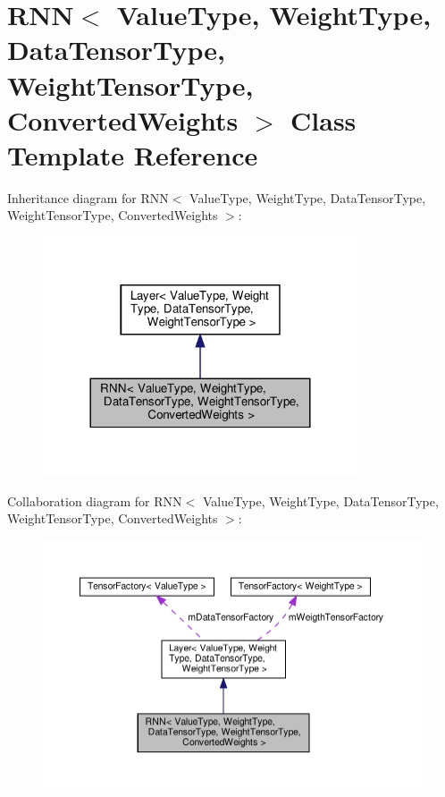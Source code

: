 \hypertarget{classRNN}{}\section{R\+NN$<$ Value\+Type, Weight\+Type, Data\+Tensor\+Type, Weight\+Tensor\+Type, Converted\+Weights $>$ Class Template Reference}
\label{classRNN}


Inheritance diagram for R\+NN$<$ Value\+Type, Weight\+Type, Data\+Tensor\+Type, Weight\+Tensor\+Type, Converted\+Weights $>$\+:
\nopagebreak
\begin{figure}[H]
\begin{center}
\leavevmode
\includegraphics[width=264pt]{classRNN__inherit__graph}
\end{center}
\end{figure}


Collaboration diagram for R\+NN$<$ Value\+Type, Weight\+Type, Data\+Tensor\+Type, Weight\+Tensor\+Type, Converted\+Weights $>$\+:
\nopagebreak
\begin{figure}[H]
\begin{center}
\leavevmode
\includegraphics[width=350pt]{classRNN__coll__graph}
\end{center}
\end{figure}
